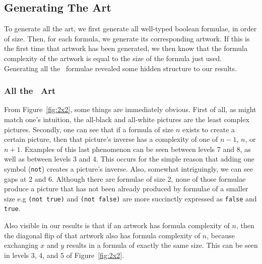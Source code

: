 \subsection{Generating The Art}

To generate all the art, we first generate all well-typed boolean formulae, in
order of size.  Then, for each formula, we generate its corresponding artwork.
If this is the first time that artwork has been generated, we then know that
the formula complexity of the artwork is equal to the size of the formula just
used.  Generating all the \twoxtwo\ formulae revealed some hidden structure to our
results.

\subsubsection{All the \twoxtwo\ Art}

From Figure~\ref{fig:2x2}, some things are immediately obvious.  First of all,
as might match one's intuition, the all-black and all-white pictures are the
least complex pictures.  Secondly, one can see that if a formula of size $n$
exists to create a certain picture, then that picture's inverse has a
complexity of one of $n-1$, $n$, or $n+1$.  Examples of this last phenomenon
can be seen between levels 7 and 8, as well as between levels 3 and 4.  This occurs
for the simple reason that adding one symbol ({\tt not}) creates a picture's
inverse.  Also, somewhat intriguingly, we can see gaps at 2 and 6.  Although
there are formulae of size 2, none of those formulae produce a picture that has
not been already produced by formulae of a smaller size e.g {\tt (not true)}
and {\tt (not false)} are more succinctly expressed as {\tt false} and {\tt
true}.

Also visible in our results is that if an artwork has formula complexity of
$n$, then the diagonal flip of that artwork also has formula complexity of $n$,
because exchanging $x$ and $y$ results in a formula of exactly the same size.
This can be seen in levels 3, 4, and 5 of Figure~\ref{fig:2x2}.

